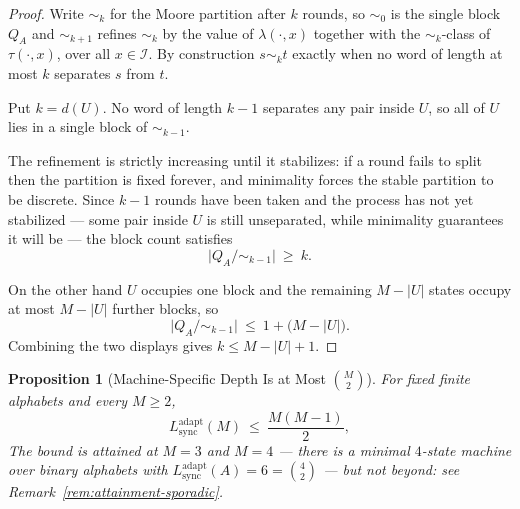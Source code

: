 \documentclass[12pt]{article}
\newtheorem{proposition}[theorem]{Proposition}
\theoremstyle{definition}
\newcommand{\Lsync}{L_{\mathrm{sync}}^{\mathrm{adapt}}}
\begin{document}
\begin{proof}
Write $\sim_k$ for the Moore partition after $k$ rounds, so $\sim_0$ is the
single block $Q_A$ and $\sim_{k+1}$ refines $\sim_k$ by the value of
$\lambda(\cdot,x)$ together with the $\sim_k$-class of $\tau(\cdot,x)$, over
all $x\in\mathcal I$.  By construction $s\sim_k t$ exactly when no word of
length at most $k$ separates $s$ from $t$.

Put $k=d(U)$.  No word of length $k-1$ separates any pair inside $U$, so all
of $U$ lies in a single block of $\sim_{k-1}$.

The refinement is strictly increasing until it stabilizes: if a round fails to
split then the partition is fixed forever, and minimality forces the stable
partition to be discrete.  Since $k-1$ rounds have been taken and the process
has not yet stabilized --- some pair inside $U$ is still unseparated, while
minimality guarantees it will be --- the block count satisfies
\[
\bigl|Q_A/{\sim_{k-1}}\bigr|\ \ge\ k .
\]

On the other hand $U$ occupies one block and the remaining $M-|U|$ states
occupy at most $M-|U|$ further blocks, so
\[
\bigl|Q_A/{\sim_{k-1}}\bigr|\ \le\ 1+\bigl(M-|U|\bigr).
\]
Combining the two displays gives $k\le M-|U|+1$.
\end{proof}

\begin{proposition}[Machine-Specific Depth Is at Most $\binom{M}{2}$]
\label{prop:lsyncu-binomial}
For fixed finite alphabets and every $M\ge2$,
\[
\Lsync(M)\ \le\ \frac{M(M-1)}{2},
\]
The bound is attained at $M=3$ and $M=4$ --- there is a minimal $4$-state
machine over binary alphabets with $\Lsync(A)=6=\binom{4}{2}$ --- but not
beyond: see Remark~\ref{rem:attainment-sporadic}.
\end{proposition}
\end{document}
